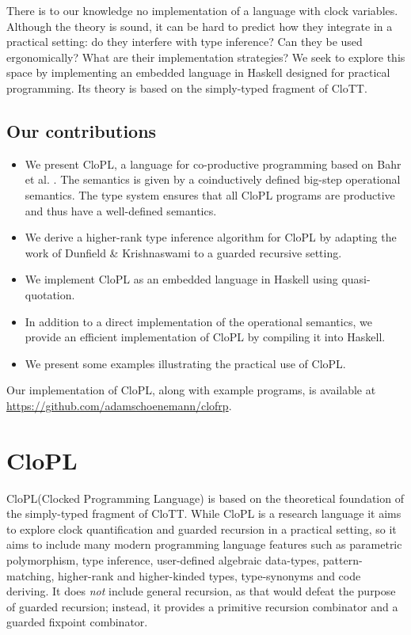 \documentclass[sigplan,9pt,review]{acmart}\settopmatter{printfolios=true,printccs=false,printacmref=false}
\newcommand{\clott}{\textsf{CloTT}\xspace}
\newcommand{\clopl}{\textsf{CloPL}\xspace}
\begin{document}
There is to our knowledge no implementation of a language with clock variables. Although
the theory is sound, it can be hard to predict how they integrate in a practical setting:
do they interfere with type inference? Can they be used ergonomically? What are their
implementation strategies? We seek to explore this space by implementing an
embedded language in Haskell designed for practical programming. Its theory is based on the
simply-typed fragment of \clott.

\subsection{Our contributions}
\begin{itemize}
  \item We present \clopl, a language for co-productive programming
        based on Bahr et al. \cite{bahrclocks}. The semantics is given by a coinductively defined
        big-step operational semantics. The type system
        ensures that all CloPL programs are productive and thus have a well-defined
        semantics.
  \item We derive a higher-rank type inference algorithm for \clopl by adapting the work of
        Dunfield \& Krishnaswami \cite{dunfield2013complete} to a guarded recursive setting.
  \item We implement \clopl as an embedded language in Haskell using quasi-quotation.
  \item In addition to a direct implementation of the operational semantics,
        we provide an efficient implementation of \clopl by compiling it into
        Haskell.
  \item We present some examples illustrating the practical use of \clopl.
\end{itemize}

Our implementation of \clopl, along with example programs, is available
at \url{https://github.com/adamschoenemann/clofrp}.

\section{\clopl}\label{sec:clopl}
\clopl (Clocked Programming Language) is based on the theoretical foundation
of the simply-typed fragment of \clott. While \clopl is a research language it aims to explore
clock quantification and guarded recursion in a practical setting, so it aims to include many
modern programming language features such as parametric polymorphism, type inference,
user-defined algebraic data-types, pattern-matching, higher-rank and higher-kinded types,
type-synonyms and code deriving.
It does \textit{not} include general recursion, as that would defeat the purpose of
guarded recursion; instead, it provides a primitive recursion combinator and a guarded
fixpoint combinator.
\end{document}
